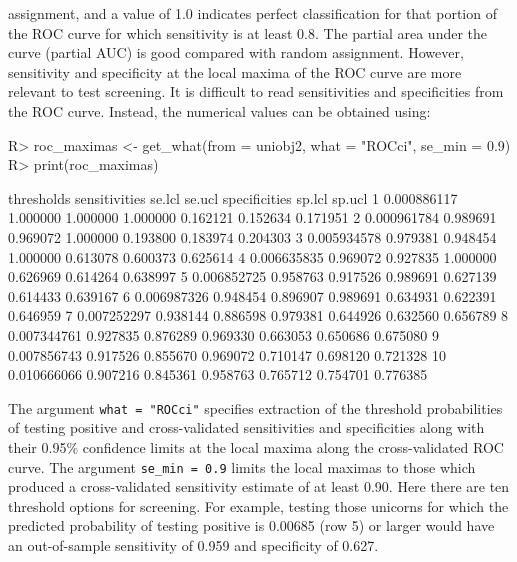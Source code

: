 \documentclass[11pt]{report}
\renewenvironment{Schunk}{\vspace{\topsep}}{\vspace{\topsep}}
\begin{document}
assignment, and a value of 1.0 indicates perfect classification for
that portion of the ROC curve for which sensitivity is at least
0.8. The partial area under the curve (partial AUC) is good compared
with random assignment. However, sensitivity and specificity at the
local maxima of the ROC curve are more relevant to test screening.  It
is difficult to read sensitivities and specificities from the ROC
curve. Instead, the numerical values can be obtained using:
\begin{Schunk}
\begin{Sinput}
R> roc_maximas <- get_what(from = uniobj2, what = "ROCci", se_min = 0.9)
R> print(roc_maximas)
\end{Sinput}
\begin{Soutput}
    thresholds sensitivities   se.lcl   se.ucl specificities   sp.lcl   sp.ucl
1  0.000886117      1.000000 1.000000 1.000000      0.162121 0.152634 0.171951
2  0.000961784      0.989691 0.969072 1.000000      0.193800 0.183974 0.204303
3  0.005934578      0.979381 0.948454 1.000000      0.613078 0.600373 0.625614
4  0.006635835      0.969072 0.927835 1.000000      0.626969 0.614264 0.638997
5  0.006852725      0.958763 0.917526 0.989691      0.627139 0.614433 0.639167
6  0.006987326      0.948454 0.896907 0.989691      0.634931 0.622391 0.646959
7  0.007252297      0.938144 0.886598 0.979381      0.644926 0.632560 0.656789
8  0.007344761      0.927835 0.876289 0.969330      0.663053 0.650686 0.675080
9  0.007856743      0.917526 0.855670 0.969072      0.710147 0.698120 0.721328
10 0.010666066      0.907216 0.845361 0.958763      0.765712 0.754701 0.776385
\end{Soutput}
\end{Schunk}

The argument \verb|what = "ROCci"| specifies extraction of the threshold
probabilities of testing positive and cross-validated sensitivities
and specificities along with their 0.95\% confidence limits at the
local maxima along the cross-validated ROC curve. The argument
\verb|se_min = 0.9| limits the local maximas to those which produced a
cross-validated sensitivity estimate of at least 0.90. Here there are
ten threshold options for screening.  For example, testing those unicorns for
which the predicted probability of testing positive is 0.00685 (row 5) or
larger would have an out-of-sample sensitivity of 0.959 and
specificity of 0.627.
\end{document}

